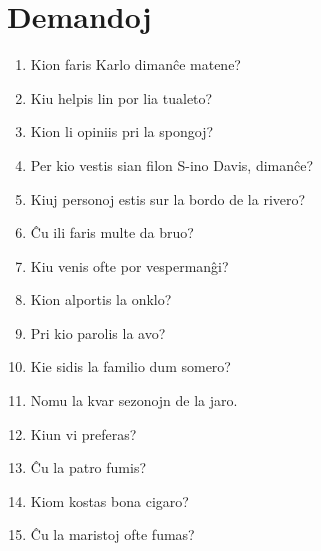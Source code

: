 \newpage

\section*{Demandoj}

\begin{enumerate}
    \item  Kion faris Karlo dimanĉe matene?
    \item  Kiu helpis lin por lia tualeto?
    \item  Kion li opiniis pri la spongoj?
    \item  Per kio vestis sian filon S-ino Davis, dimanĉe?
    \item  Kiuj personoj estis sur la bordo de la rivero?
    \item  Ĉu ili faris multe da bruo?
    \item  Kiu venis ofte por vespermanĝi?
    \item  Kion alportis la onklo?
    \item  Pri kio parolis la avo?
    \item  Kie sidis la familio dum somero?
    \item  Nomu la kvar sezonojn de la jaro.
    \item  Kiun vi preferas?
    \item  Ĉu la patro fumis?
    \item  Kiom kostas bona cigaro?
    \item  Ĉu la maristoj ofte fumas?
\end{enumerate}
